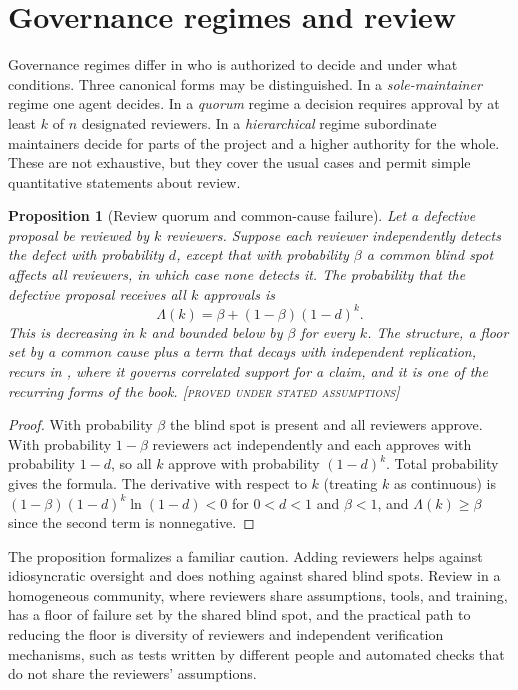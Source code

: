\documentclass[11pt,twoside,openright]{book}
\theoremstyle{plain}
\newtheorem{proposition}[theorem]{Proposition}
\theoremstyle{definition}
\theoremstyle{remark}
\newcommand{\Proved}{\textup{\textsc{[proved under stated assumptions]}}}
\begin{document}
\section{Governance regimes and review}

Governance regimes differ in who is authorized to decide and under what conditions. Three canonical forms may be distinguished. In a \emph{sole-maintainer} regime one agent decides. In a \emph{quorum} regime a decision requires approval by at least $k$ of $n$ designated reviewers. In a \emph{hierarchical} regime subordinate maintainers decide for parts of the project and a higher authority for the whole. These are not exhaustive, but they cover the usual cases and permit simple quantitative statements about review.

\begin{proposition}[Review quorum and common-cause failure]\label{prop:quorum}
Let a defective proposal be reviewed by $k$ reviewers. Suppose each reviewer independently detects the defect with probability $d$, except that with probability $\beta$ a common blind spot affects all reviewers, in which case none detects it. The probability that the defective proposal receives all $k$ approvals is
\[
\Lambda(k)=\beta+(1-\beta)(1-d)^k.
\]
This is decreasing in $k$ and bounded below by $\beta$ for every $k$. The structure, a floor set by a common cause plus a term that decays with independent replication, recurs in , where it governs correlated support for a claim, and it is one of the recurring forms of the book.
\Proved{}
\end{proposition}

\begin{proof}
With probability $\beta$ the blind spot is present and all reviewers approve. With probability $1-\beta$ reviewers act independently and each approves with probability $1-d$, so all $k$ approve with probability $(1-d)^k$. Total probability gives the formula. The derivative with respect to $k$ (treating $k$ as continuous) is $(1-\beta)(1-d)^k\ln(1-d)<0$ for $0<d<1$ and $\beta<1$, and $\Lambda(k)\ge\beta$ since the second term is nonnegative.
\end{proof}

The proposition formalizes a familiar caution. Adding reviewers helps against idiosyncratic oversight and does nothing against shared blind spots. Review in a homogeneous community, where reviewers share assumptions, tools, and training, has a floor of failure set by the shared blind spot, and the practical path to reducing the floor is diversity of reviewers and independent verification mechanisms, such as tests written by different people and automated checks that do not share the reviewers' assumptions.
\end{document}
